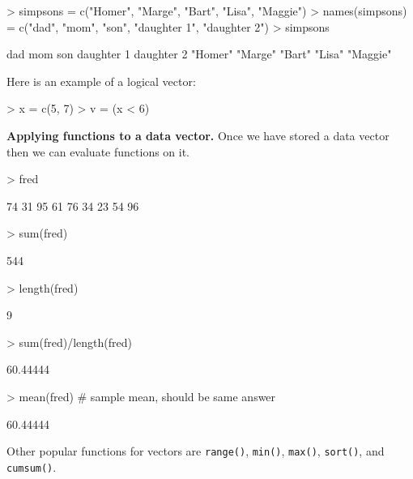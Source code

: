 \documentclass[english]{article}
\renewenvironment{Schunk}{\vspace{\topsep}}{\vspace{\topsep}}
\begin{document}
\begin{Schunk}
\begin{Sinput}
> simpsons = c("Homer", "Marge", "Bart", "Lisa", "Maggie")
> names(simpsons) = c("dad", "mom", "son", "daughter 1", "daughter 2")
> simpsons
\end{Sinput}
\begin{Soutput}
       dad        mom        son daughter 1 daughter 2 
   "Homer"    "Marge"     "Bart"     "Lisa"   "Maggie" 
\end{Soutput}
\end{Schunk}


Here is an example of a logical vector:

\begin{Schunk}
\begin{Sinput}
> x = c(5, 7)
> v = (x < 6)
\end{Sinput}
\end{Schunk}


\textbf{Applying functions to a data vector.} Once we have stored
a data vector then we can evaluate functions on it. 

\begin{Schunk}
\begin{Sinput}
> fred
\end{Sinput}
\begin{Soutput}
[1] 74 31 95 61 76 34 23 54 96
\end{Soutput}
\begin{Sinput}
> sum(fred)
\end{Sinput}
\begin{Soutput}
[1] 544
\end{Soutput}
\begin{Sinput}
> length(fred)
\end{Sinput}
\begin{Soutput}
[1] 9
\end{Soutput}
\begin{Sinput}
> sum(fred)/length(fred)
\end{Sinput}
\begin{Soutput}
[1] 60.44444
\end{Soutput}
\begin{Sinput}
> mean(fred)                 # sample mean, should be same answer
\end{Sinput}
\begin{Soutput}
[1] 60.44444
\end{Soutput}
\end{Schunk}


Other popular functions for vectors are \texttt{range()}, \texttt{min()},
\texttt{max()}, \texttt{sort()}, and \texttt{cumsum()}.
\end{document}
